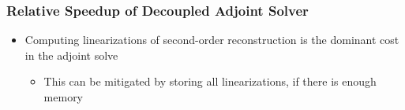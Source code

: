 \documentclass{beamer}
\begin{document}
\begin{frame}
  \frametitle{Relative Speedup of Decoupled Adjoint Solver}
  \begin{figure}[h]
    \centering
  \end{figure}
  \begin{itemize}
    \item Computing linearizations of second-order reconstruction is the
      dominant cost in the adjoint solve
      \begin{itemize}
        \item This can be mitigated by storing all linearizations, if there is
          enough memory
      \end{itemize}
  \end{itemize}
\end{frame}
\end{document}
